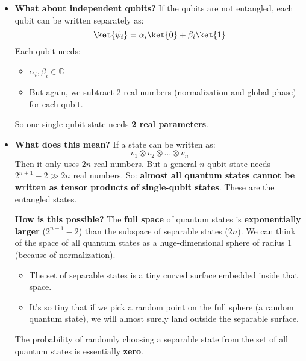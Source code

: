 \begin{itemize}
    

    \item {}
    
    \textcolor{Green3}{ \textbf{What about independent qubits?}} If the qubits are not entangled, each qubit can be written separately as:
    \begin{equation*}
        \ket{\psi_{i}} = \alpha_{i}\ket{0} + \beta_{i}\ket{1}
    \end{equation*}
    Each qubit needs:
    \begin{itemize}
        \item $\alpha_{i}, \beta_{i} \in \mathbb{C}$
        \item But again, we subtract 2 real numbers (normalization and global phase) for each qubit.
    \end{itemize}
    So one single qubit state needs \textbf{2 real parameters}.

    


    \item {}

    \textcolor{Green3}{ \textbf{What does this mean?}} If a state can be written as:
    \begin{equation*}
        v_{1} \otimes v_{2} \otimes \dots \otimes v_{n}
    \end{equation*}
    Then it only uses $2n$ real numbers. But a general $n$-qubit state needs $2^{n+1}-2 \gg 2n$ real numbers. So: \textbf{almost all quantum states cannot be written as tensor products of single-qubit states}. These are the entangled states.

    \highspace
    \textcolor{Green3}{ \textbf{How is this possible?}} The \textbf{full space} of quantum states is \textbf{exponentially larger} ($2^{n+1}-2$) than the subspace of separable states ($2n$). We can think of the space of all quantum states as a huge-dimensional sphere of radius 1 (because of normalization).
    \begin{itemize}
        \item The set of separable states is a tiny curved surface embedded inside that space.
        \item It's so tiny that if we pick a random point on the full sphere (a random quantum state), we will almost surely land outside the separable surface.
    \end{itemize}
    The probability of randomly choosing a separable state from the set of all quantum states is essentially \textbf{zero}.


\end{itemize}
